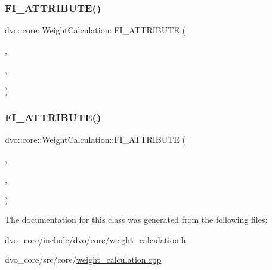 \mbox{\label{classdvo_1_1core_1_1_weight_calculation_af54b17f9cf42a43beb7556ea1ef78082}} 
\subsubsection{\texorpdfstring{F\+I\+\_\+\+A\+T\+T\+R\+I\+B\+U\+T\+E()}{FI\_ATTRIBUTE()}\hspace{0.1cm}{\footnotesize\ttfamily [2/3]}}
{\footnotesize\ttfamily dvo\+::core\+::\+Weight\+Calculation\+::\+F\+I\+\_\+\+A\+T\+T\+R\+I\+B\+U\+TE (\begin{DoxyParamCaption}\item[{\mbox{\hyperlink{classdvo_1_1core_1_1_weight_calculation}{Weight\+Calculation}}}]{,  }\item[{\mbox{\hyperlink{classdvo_1_1core_1_1_influence_function}{Influence\+Function}} $\ast$}]{,  }\item[{influence\+Function}]{ }\end{DoxyParamCaption})}

\mbox{\label{classdvo_1_1core_1_1_weight_calculation_ae3d2c55437f00625058a67bd37d80826}} 
\subsubsection{\texorpdfstring{F\+I\+\_\+\+A\+T\+T\+R\+I\+B\+U\+T\+E()}{FI\_ATTRIBUTE()}\hspace{0.1cm}{\footnotesize\ttfamily [3/3]}}
{\footnotesize\ttfamily dvo\+::core\+::\+Weight\+Calculation\+::\+F\+I\+\_\+\+A\+T\+T\+R\+I\+B\+U\+TE (\begin{DoxyParamCaption}\item[{\mbox{\hyperlink{classdvo_1_1core_1_1_weight_calculation}{Weight\+Calculation}}}]{,  }\item[{float}]{,  }\item[{scale}]{ }\end{DoxyParamCaption})}



The documentation for this class was generated from the following files\+:\begin{DoxyCompactItemize}
\item 
dvo\+\_\+core/include/dvo/core/\mbox{\hyperlink{weight__calculation_8h}{weight\+\_\+calculation.\+h}}\item 
dvo\+\_\+core/src/core/\mbox{\hyperlink{weight__calculation_8cpp}{weight\+\_\+calculation.\+cpp}}\end{DoxyCompactItemize}
